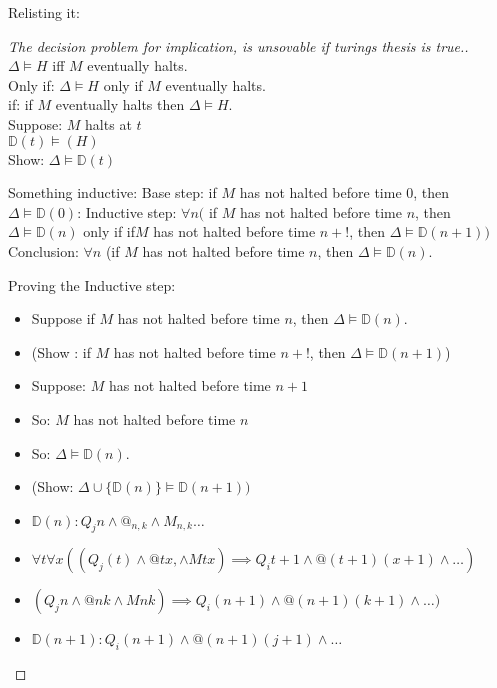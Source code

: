 Relisting it: 
\begin{proof}[The decision problem for implication, is unsovable if turings thesis is true.]
$\Delta \vDash H$ iff $M$ eventually halts. \\
Only if: $\Delta \vDash H$ only if $M$ eventually halts. \\
if: if $M$ eventually halts then $\Delta \vDash H$. \\
Suppose: $M$ halts at $t$\\
$\mathbb{D}(t) \vDash(H)$ \\ %
Show: $\Delta \vDash \mathbb{D}(t)$

Something inductive:
Base step: if $M$ has not halted before time 0, then $\Delta \vDash \mathbb{D}(0)$:
Inductive step: $\forall n ($ if $M$ has not halted before time $n$, then $\Delta \vDash \mathbb{D}(n)$ only if if$M$ has not halted before time $n+!$, then $\Delta \vDash \mathbb{D}(n+1))$
Conclusion: $\forall n$ (if $M$  has not halted before time $n$, then $\Delta \vDash \mathbb{D}(n)$.

Proving the Inductive step: \\
\begin{itemize}
\item Suppose if $M$ has not halted before time $n$, then $\Delta \vDash \mathbb{D}(n)$.
\item (Show : if $M$ has not halted before time $n+!$, then $\Delta \vDash \mathbb{D}(n+1)$)
\item Suppose: $M$ has not halted before time $n+1$
\item So: $M$ has not halted before time $n$
\item So: $\Delta \vDash \mathbb{D}(n)$.
\item (Show: $\Delta \cup \{\mathbb{D}(n)\} \vDash \mathbb{D}(n+1))$
\item $\mathbb{D}(n): Q_jn \wedge @_{n,k} \wedge M_{n,k} \dots$
\item $\forall t \forall x ((Q_j(t) \wedge @tx, \wedge Mtx) \implies Q_it+1 \wedge @(t+1)(x+1) \wedge \dots)$
\item $(Q_jn \wedge @nk \wedge Mnk) \implies Q_i(n+1) \wedge @(n+1)(k+1) \wedge \dots)$
\item $\mathbb{D}(n+1): Q_i(n+1) \wedge @(n+1)(j+1)\wedge \dots$
\end{itemize}

\end{proof}

